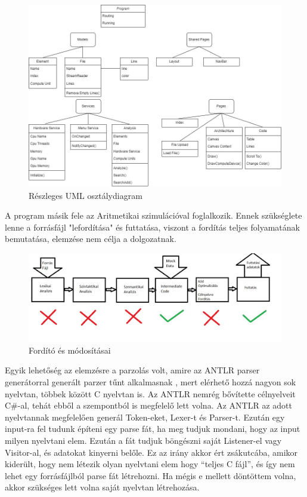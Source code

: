 \begin{figure}[h!]
\centering
\includegraphics[width=\textwidth]{images/UML.jpg}
\caption{Részleges UML osztálydiagram}
\label{fig:uml}
\end{figure}

A program másik fele az Aritmetikai szimulációval foglalkozik. Ennek szükséglete lenne a forrásfájl "lefordítása" és futtatása, viszont a fordítás teljes folyamatának bemutatása, elemzése nem célja a dolgozatnak.

\begin{figure}[h!]
\centering
\includegraphics[width=\textwidth]{images/Compiler.jpg}
\caption{Fordító és módosításai}
\label{fig:compiler}
\end{figure}

Egyik lehetőség az elemzésre a parzolás volt, amire az ANTLR parser generátorral generált parzer tűnt alkalmasnak \cite{antlr}, mert elérhető hozzá nagyon sok nyelvtan, többek között C nyelvtan is. Az ANTLR nemrég bővítette célnyelveit C{\#}-al, tehát ebből a szempontból is megfelelő lett volna. Az ANTLR az adott nyelvtannak megfelelően generál Token-eket, Lexer-t és Parser-t. Ezután egy input-ra fel tudunk építeni egy parse fát, ha meg tudjuk mondani, hogy az input milyen nyelvtani elem. Ezután a fát tudjuk böngészni saját Listener-el vagy Visitor-al, és adatokat kinyerni belőle. Ez az irány akkor ért zsákutcába, amikor kiderült, hogy nem létezik olyan nyelvtani elem hogy “teljes C fájl”, és így nem lehet egy forrásfájlból parse fát létrehozni. Ha mégis e mellett döntöttem volna, akkor szükséges lett volna saját nyelvtan létrehozása.

